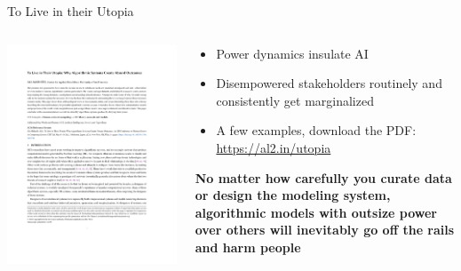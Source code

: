 \documentclass[main]{subfiles}
\begin{document}
\begin{frame}[t]{To Live in their Utopia}

\begin{columns}[T]

\begin{column}{0.5\textwidth}
\vspace{-2em}
  \includegraphics[width=\textwidth]{utopia.pdf}
\end{column}

\begin{column}{0.5\textwidth}
{\large\begin{itemize}
  \item Power dynamics insulate AI
  \item Disempowered stakeholders routinely and consistently get marginalized
  \item A few examples, download the PDF:\\ \url{https://al2.in/utopia}
\end{itemize}}

\vspace{2em}

  {\large\bfseries No matter how carefully you curate data or design the modeling system, algorithmic models with outsize power over others will inevitably go off the rails and harm people}

\end{column}
\end{columns}
\end{frame}
\end{document}
